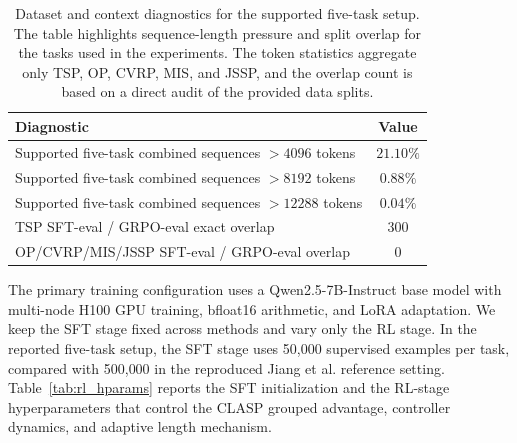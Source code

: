 \documentclass{article}
\theoremstyle{remark}
\begin{document}
\begin{table}[!b]
\caption{Dataset and context diagnostics for the supported five-task setup. The table highlights sequence-length pressure and split overlap for the tasks used in the experiments. The token statistics aggregate only TSP, OP, CVRP, MIS, and JSSP, and the overlap count is based on a direct audit of the provided data splits.}
\label{tab:diagnostics}
\centering
\small
\begin{tabular}{lc}
\toprule
Diagnostic & Value \\
\midrule
Supported five-task combined sequences \(> 4096\) tokens & \(21.10\%\) \\
Supported five-task combined sequences \(> 8192\) tokens & \(0.88\%\) \\
Supported five-task combined sequences \(> 12288\) tokens & \(0.04\%\) \\
TSP SFT-eval / GRPO-eval exact overlap & \(300\) \\
OP/CVRP/MIS/JSSP SFT-eval / GRPO-eval overlap & \(0\) \\
\bottomrule
\end{tabular}
\end{table}

The primary training configuration uses a Qwen2.5-7B-Instruct base model with multi-node H100 GPU training, bfloat16 arithmetic, and LoRA adaptation. We keep the SFT stage fixed across methods and vary only the RL stage. In the reported five-task setup, the SFT stage uses 50{,}000 supervised examples per task, compared with 500{,}000 in the reproduced Jiang et al. reference setting. Table~\ref{tab:rl_hparams} reports the SFT initialization and the RL-stage hyperparameters that control the CLASP grouped advantage, controller dynamics, and adaptive length mechanism.
\end{document}
